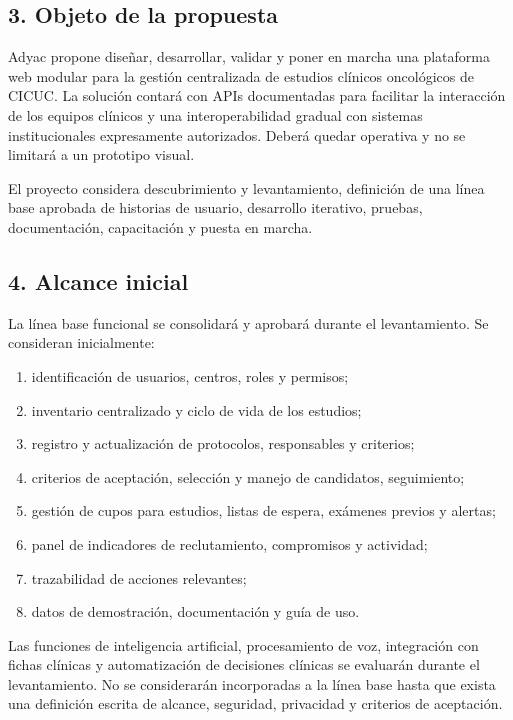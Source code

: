 \documentclass[
]{article}
\providecommand{\tightlist}{%
  \setlength{\itemsep}{0pt}\setlength{\parskip}{0pt}}
\begin{document}
\hypertarget{3-objeto-de-la-propuesta}{%
\subsection{3. Objeto de la propuesta}\label{3-objeto-de-la-propuesta}}

Adyac propone diseñar, desarrollar, validar y poner en marcha una
plataforma web modular para la gestión centralizada de estudios clínicos
oncológicos de CICUC. La solución contará con APIs documentadas para
facilitar la interacción de los equipos clínicos y una interoperabilidad
gradual con sistemas institucionales expresamente autorizados. Deberá
quedar operativa y no se limitará a un prototipo visual.

El proyecto considera descubrimiento y levantamiento, definición de una
línea base aprobada de historias de usuario, desarrollo iterativo,
pruebas, documentación, capacitación y puesta en marcha.

\hypertarget{4-alcance-inicial}{%
\subsection{4. Alcance inicial}\label{4-alcance-inicial}}

La línea base funcional se consolidará y aprobará durante el
levantamiento. Se consideran inicialmente:

\begin{enumerate}
\def\labelenumi{\arabic{enumi}.}
\tightlist
\item
  identificación de usuarios, centros, roles y permisos;
\item
  inventario centralizado y ciclo de vida de los estudios;
\item
  registro y actualización de protocolos, responsables y criterios;
\item
  criterios de aceptación, selección y manejo de candidatos,
  seguimiento;
\item
  gestión de cupos para estudios, listas de espera, exámenes previos y
  alertas;
\item
  panel de indicadores de reclutamiento, compromisos y actividad;
\item
  trazabilidad de acciones relevantes;
\item
  datos de demostración, documentación y guía de uso.
\end{enumerate}

Las funciones de inteligencia artificial, procesamiento de voz,
integración con fichas clínicas y automatización de decisiones clínicas
se evaluarán durante el levantamiento. No se considerarán incorporadas a
la línea base hasta que exista una definición escrita de alcance,
seguridad, privacidad y criterios de aceptación.
\end{document}
